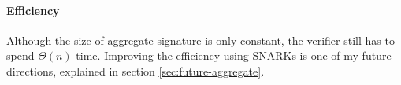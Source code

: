 \paragraph{Efficiency} Although the size of aggregate signature is only constant, the verifier still has to spend $\Theta(n)$ time. Improving the efficiency using SNARKs is one of my future directions, explained in section \ref{sec:future-aggregate}. %




